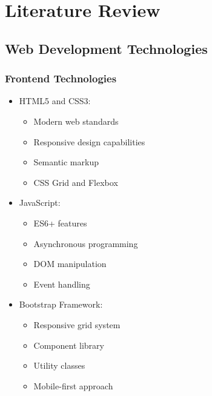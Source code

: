 \chapter{Literature Review}
\label{chap:literature}

\section{Web Development Technologies}
\subsection{Frontend Technologies}
\begin{itemize}
    \item HTML5 and CSS3:
    \begin{itemize}
        \item Modern web standards
        \item Responsive design capabilities
        \item Semantic markup
        \item CSS Grid and Flexbox
    \end{itemize}
    \item JavaScript:
    \begin{itemize}
        \item ES6+ features
        \item Asynchronous programming
        \item DOM manipulation
        \item Event handling
    \end{itemize}
    \item Bootstrap Framework:
    \begin{itemize}
        \item Responsive grid system
        \item Component library
        \item Utility classes
        \item Mobile-first approach
    \end{itemize}
\end{itemize}

